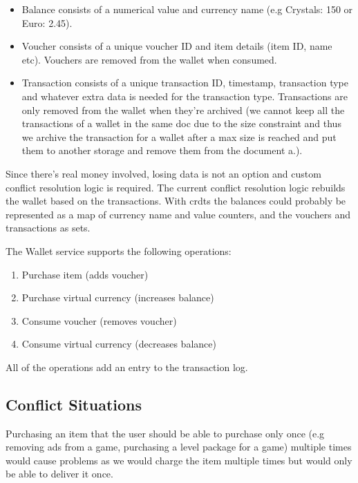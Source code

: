 \documentclass[11pt,a4paper]{report}
\begin{document}
\begin{itemize}
\item Balance consists of a numerical value and currency name (e.g Crystals: 150 or Euro: 2.45).
\item Voucher consists of a unique voucher ID and item details (item ID, name etc). Vouchers are removed from the wallet when consumed.
\item Transaction consists of a unique transaction ID, timestamp, transaction type and whatever extra data is needed for the transaction type. Transactions are only removed from the wallet when they're archived (we cannot keep all the transactions of a wallet in the same doc due to the size constraint and thus we archive the transaction for a wallet after a max size is reached and put them to another storage and remove them from the document a.).
\end{itemize}

Since there's real money involved, losing data is not an option and custom conflict resolution logic is required. The current conflict resolution logic rebuilds the wallet based on the transactions. With \glspl{crdt} the balances could probably be represented as a map of currency name and value counters, and the vouchers and transactions as sets.

The Wallet service supports the following operations:
\begin{enumerate}
\item Purchase item (adds voucher)
\item Purchase virtual currency (increases balance)
\item Consume voucher (removes voucher)
\item Consume virtual currency (decreases balance)
\end{enumerate}
All of the operations add an entry to the transaction log.

\subsection{Conflict Situations}
Purchasing an item that the user should be able to purchase only once (e.g removing ads from a game, purchasing a level package for a game) multiple times would cause problems as we would charge the item multiple times but would only be able to deliver it once.
\end{document}
